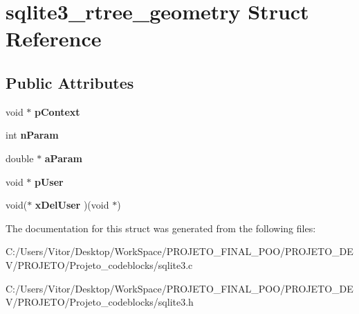 \hypertarget{structsqlite3__rtree__geometry}{\section{sqlite3\-\_\-rtree\-\_\-geometry Struct Reference}
\label{structsqlite3__rtree__geometry}
}
\subsection*{Public Attributes}
\begin{DoxyCompactItemize}
\item 
\hypertarget{structsqlite3__rtree__geometry_a33f98691626846c1317419654d5c5f51}{void $\ast$ {\bfseries p\-Context}}\label{structsqlite3__rtree__geometry_a33f98691626846c1317419654d5c5f51}

\item 
\hypertarget{structsqlite3__rtree__geometry_ada7b9eba82660e3321dd4c93526697c9}{int {\bfseries n\-Param}}\label{structsqlite3__rtree__geometry_ada7b9eba82660e3321dd4c93526697c9}

\item 
\hypertarget{structsqlite3__rtree__geometry_aa23f6565e6fee2416444333a75716057}{double $\ast$ {\bfseries a\-Param}}\label{structsqlite3__rtree__geometry_aa23f6565e6fee2416444333a75716057}

\item 
\hypertarget{structsqlite3__rtree__geometry_a6fdedfd741cf5055f9562298cd32dc74}{void $\ast$ {\bfseries p\-User}}\label{structsqlite3__rtree__geometry_a6fdedfd741cf5055f9562298cd32dc74}

\item 
\hypertarget{structsqlite3__rtree__geometry_afa1ed10f488b306df354efe56efdf287}{void($\ast$ {\bfseries x\-Del\-User} )(void $\ast$)}\label{structsqlite3__rtree__geometry_afa1ed10f488b306df354efe56efdf287}

\end{DoxyCompactItemize}


The documentation for this struct was generated from the following files\-:\begin{DoxyCompactItemize}
\item 
C\-:/\-Users/\-Vitor/\-Desktop/\-Work\-Space/\-P\-R\-O\-J\-E\-T\-O\-\_\-\-F\-I\-N\-A\-L\-\_\-\-P\-O\-O/\-P\-R\-O\-J\-E\-T\-O\-\_\-\-D\-E\-V/\-P\-R\-O\-J\-E\-T\-O/\-Projeto\-\_\-codeblocks/sqlite3.\-c\item 
C\-:/\-Users/\-Vitor/\-Desktop/\-Work\-Space/\-P\-R\-O\-J\-E\-T\-O\-\_\-\-F\-I\-N\-A\-L\-\_\-\-P\-O\-O/\-P\-R\-O\-J\-E\-T\-O\-\_\-\-D\-E\-V/\-P\-R\-O\-J\-E\-T\-O/\-Projeto\-\_\-codeblocks/sqlite3.\-h\end{DoxyCompactItemize}
